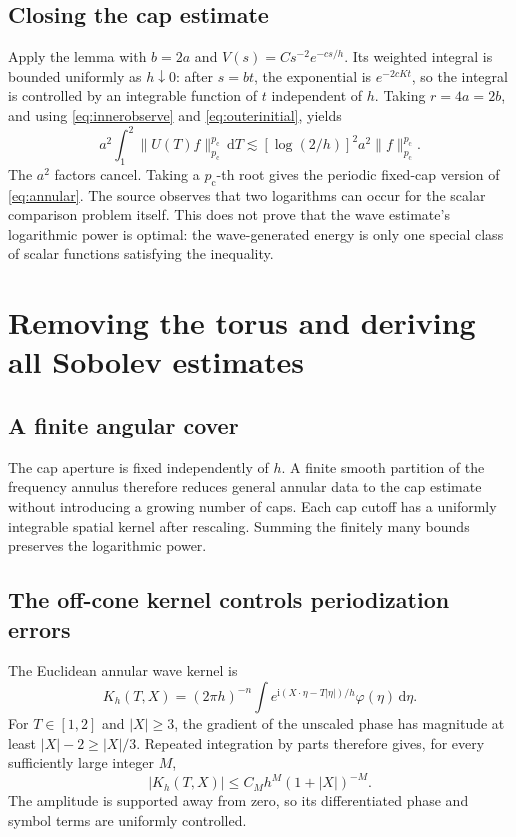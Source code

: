 \documentclass[11pt,a4paper]{article}
\numberwithin{equation}{section}
\theoremstyle{definition}
\theoremstyle{remark}
\newcommand{\dd}{\,\mathrm d}
\newcommand{\pc}{p_{\mathrm c}}
\begin{document}
\subsection{Closing the cap estimate}
Apply the lemma with $b=2a$ and
$V(s)=Cs^{-2}e^{-cs/h}$. Its weighted integral is bounded uniformly as
$h\downarrow0$: after $s=bt$, the exponential is $e^{-2cKt}$, so the integral
is controlled by an integrable function of $t$ independent of $h$.
Taking $r=4a=2b$, and using \eqref{eq:innerobserve} and
\eqref{eq:outerinitial}, yields
\[
 a^2\int_1^2\|U(T)f\|_{\pc}^{\pc}\dd T
 \lesssim [\log(2/h)]^2 a^2\|f\|_{\pc}^{\pc}.
\]
The $a^2$ factors cancel. Taking a $\pc$-th root gives the periodic fixed-cap
version of \eqref{eq:annular}. The source observes that two logarithms can
occur for the scalar comparison problem itself. This does not prove that the
wave estimate's logarithmic power is optimal: the wave-generated energy is
only one special class of scalar functions satisfying the inequality.

\section{Removing the torus and deriving all Sobolev estimates}
\label{sec:transfer}
\subsection{A finite angular cover}
The cap aperture is fixed independently of $h$. A finite smooth partition
of the frequency annulus therefore reduces general annular data to the cap
estimate without introducing a growing number of caps. Each cap cutoff has a
uniformly integrable spatial kernel after rescaling. Summing the finitely many
bounds preserves the logarithmic power.

\subsection{The off-cone kernel controls periodization errors}
The Euclidean annular wave kernel is
\[
 K_h(T,X)=(2\pi h)^{-n}\int
 e^{\mathrm i(X\cdot\eta-T|\eta|)/h}\varphi(\eta)\dd\eta.
\]
For $T\in[1,2]$ and $|X|\ge3$, the gradient of the unscaled phase has magnitude
at least $|X|-2\ge|X|/3$. Repeated integration by parts therefore gives, for
every sufficiently large integer $M$,
\begin{equation}\label{eq:offcone}
 |K_h(T,X)|\le C_Mh^M(1+|X|)^{-M}.
\end{equation}
The amplitude is supported away from zero, so its differentiated phase and
symbol terms are uniformly controlled.
\end{document}
